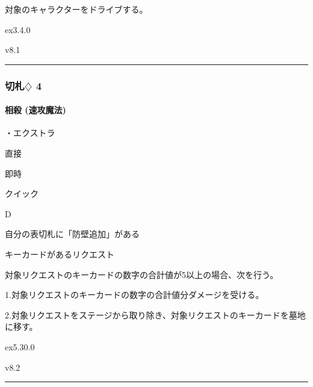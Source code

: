 \documentclass[letterpaper,10pt,dvipdfmx]{sphinxmanual}
\begin{document}
\sphinxAtStartPar
対象のキャラクターをドライブする。

\sphinxAtStartPar
{}  ex3.4.0

\sphinxAtStartPar
{}  v8.1


\bigskip\hrule\bigskip



\subsubsection{切札{\normalsize $\diamondsuit$} 4}
\label{\detokenize{auto/frameActionlist:id58}}

\paragraph{相殺 (速攻魔法)}
\label{\detokenize{auto/frameActionlist:act-reckoning}}\label{\detokenize{auto/frameActionlist:id59}}
\sphinxAtStartPar
{}

\sphinxAtStartPar
・エクストラ

\sphinxAtStartPar
{} 直接

\sphinxAtStartPar
{} 即時

\sphinxAtStartPar
{} クイック

\sphinxAtStartPar
{} D

\sphinxAtStartPar
{}

\sphinxAtStartPar
自分の表切札に「防壁追加」がある

\sphinxAtStartPar
{}

\sphinxAtStartPar
キーカードがあるリクエスト

\sphinxAtStartPar
{}

\sphinxAtStartPar
対象リクエストのキーカードの数字の合計値が5以上の場合、次を行う。

\sphinxAtStartPar
1.対象リクエストのキーカードの数字の合計値分ダメージを受ける。

\sphinxAtStartPar
2.対象リクエストをステージから取り除き、対象リクエストのキーカードを墓地に移す。

\sphinxAtStartPar
{}  ex5.30.0

\sphinxAtStartPar
{}  v8.2


\bigskip\hrule\bigskip
\end{document}
